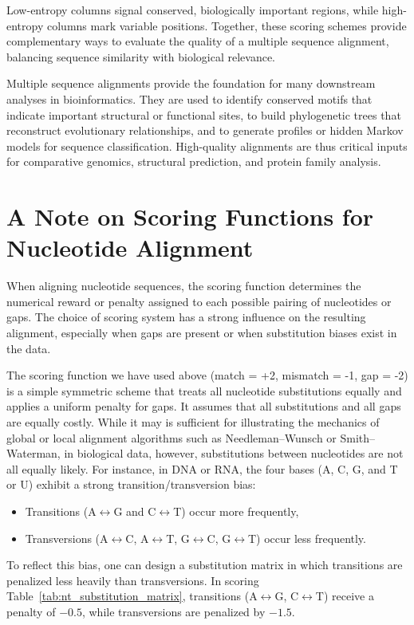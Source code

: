 Low-entropy columns signal conserved, biologically important regions, while high-entropy columns mark variable positions. Together, these scoring schemes provide complementary ways to evaluate the quality of a multiple sequence alignment, balancing sequence similarity with biological relevance.

Multiple sequence alignments provide the foundation for many downstream analyses in bioinformatics. They are used to identify conserved motifs that indicate important structural or functional sites, to build phylogenetic trees that reconstruct evolutionary relationships, and to generate profiles or hidden Markov models for sequence classification. High-quality alignments are thus critical inputs for comparative genomics, structural prediction, and protein family analysis.

\section{A Note on Scoring Functions for Nucleotide Alignment}

When aligning nucleotide sequences, the scoring function determines the numerical reward or penalty assigned to each possible pairing of nucleotides or gaps. The choice of scoring system has a strong influence on the resulting alignment, especially when gaps are present or when substitution biases exist in the data.

The scoring function we have used above (match = +2, mismatch = -1, gap = -2) is a simple symmetric scheme that treats all nucleotide substitutions equally and applies a uniform penalty for gaps. It assumes that all substitutions and all gaps are equally costly.  While it may is sufficient for illustrating the mechanics of global or local alignment algorithms such as Needleman–Wunsch or Smith–Waterman, in biological data, however, substitutions between nucleotides are not all equally likely.  For instance, in DNA or RNA, the four bases (A, C, G, and T or U) exhibit a strong transition/transversion bias:

\begin{itemize}
    \item Transitions (A$\leftrightarrow$G and C$\leftrightarrow$T) occur more frequently,
    \item Transversions (A$\leftrightarrow$C, A$\leftrightarrow$T, G$\leftrightarrow$C, G$\leftrightarrow$T) occur less frequently.
\end{itemize}

To reflect this bias, one can design a substitution matrix in which transitions are penalized less heavily than transversions. In scoring Table~\ref{tab:nt_substitution_matrix}, transitions (A$\leftrightarrow$G, C$\leftrightarrow$T) receive a penalty of $-0.5$, while transversions are penalized by $-1.5$.

